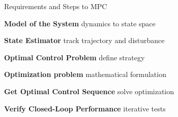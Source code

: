 
\begin{sstTitleBox}[BrickRed]{
		Requirements and Steps to MPC
	}
	\begin{centering}
		\begin{sstOnlyFrame}[BrickRed]
			\small
			\textbf{Model of the System}
			dynamics to state space

			\textbf{State Estimator}
			track trajectory and disturbance

			\textbf{Optimal Control Problem}
			define strategy

			\textbf{Optimization problem}
			mathematical formulation

			\textbf{Get Optimal Control Sequence}
			solve optimization

			\textbf{Verify Closed-Loop Performance}
			iterative tests
		\end{sstOnlyFrame}
	\end{centering}
\end{sstTitleBox}

